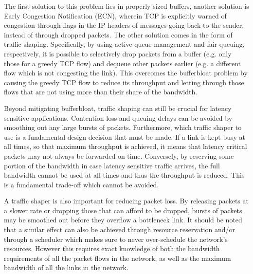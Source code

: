 The first solution to this problem lies in properly sized buffers, another solution is Early Congestion Notification (ECN), wherein TCP is explicitly warned of congestion through flags in the IP headers of messages going back to the sender, instead of through dropped packets. The other solution comes in the form of traffic shaping. Specifically, by using active queue management and fair queuing, respectively,  it is possible to selectively drop packets from a buffer (e.g. only those for a greedy TCP flow) and dequeue other packets earlier (e.g. a different flow which is not congesting the link). This overcomes the bufferbloat problem by causing the greedy TCP flow to reduce its throughput and letting through those flows that are not using more than their share of the bandwidth.

Beyond mitigating bufferbloat, traffic shaping can still be crucial for latency sensitive applications. Contention loss and queuing delays can be avoided by smoothing out any large bursts of packets. Furthermore, which traffic shaper to use is a fundamental design decision that must be made. If a link is kept busy at all times, so that maximum throughput is achieved, it means that latency critical packets may not always be forwarded on time. Conversely, by reserving some portion of the bandwidth in case latency sensitive traffic arrives, the full bandwidth cannot be used at all times and thus the throughput is reduced. This is a fundamental trade-off which cannot be avoided.



A traffic shaper is also important for reducing packet loss. By releasing packets at a slower rate or dropping those that can afford to be dropped, bursts of packets may be smoothed out before they overflow a bottleneck link. It should be noted that a similar effect can also be achieved through resource reservation and/or through a scheduler which makes sure to never over-schedule the network's resources. However this requires exact knowledge of both the bandwidth requirements of all the packet flows in the network, as well as the maximum bandwidth of all the links in the network.


